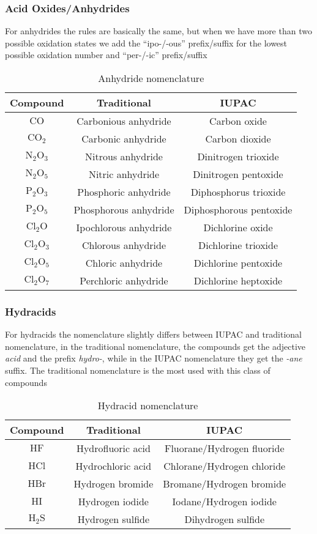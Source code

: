 \documentclass[../qm.tex]{subfiles}
\begin{document}
\subsubsection{Acid Oxides/Anhydrides}
For anhydrides the rules are basically the same, but when we have more than two possible oxidation states we add the ``ipo-/-ous'' prefix/suffix for the lowest possible oxidation number and ``per-/-ic'' prefix/suffix 
\begin{table}[H]
	\centering
	\begin{tabular}{c|c|c}
		Compound&Traditional&IUPAC\\\hline
		$\mathrm{CO}$&Carbonious anhydride&Carbon oxide\\\hline
		$\mathrm{CO_2}$&Carbonic anhydride&Carbon dioxide\\\hline
		$\mathrm{N_2O_3}$&Nitrous anhydride&Dinitrogen trioxide\\\hline
		$\mathrm{N_2O_5}$&Nitric anhydride&Dinitrogen pentoxide\\\hline
		$\mathrm{P_2O_3}$&Phosphoric anhydride&Diphosphorus trioxide\\\hline
		$\mathrm{P_2O_5}$&Phosphorous anhydride&Diphosphorous pentoxide\\\hline
		$\mathrm{Cl_2O}$&Ipochlorous anhydride&Dichlorine oxide\\\hline
		$\mathrm{Cl_2O_3}$&Chlorous anhydride&Dichlorine trioxide\\\hline
		$\mathrm{Cl_2O_5}$&Chloric anhydride&Dichlorine pentoxide\\\hline
		$\mathrm{Cl_2O_7}$&Perchloric anhydride&Dichlorine heptoxide\\\hline
	\end{tabular}
	\caption{Anhydride nomenclature}
	\label{tab:anhydrides.chem}
\end{table}
\subsubsection{Hydracids}
For hydracids the nomenclature slightly differs between IUPAC and traditional nomenclature, in the traditional nomenclature, the compounds get the adjective \textit{acid} and the prefix \textit{hydro-}, while in the IUPAC nomenclature they get the \textit{-ane} suffix. The traditional nomenclature is the most used with this class of compounds
\begin{table}[H]
	\centering
	\begin{tabular}{c|c|c}
		Compound&Traditional&IUPAC\\\hline	
		$\mathrm{HF}$&Hydrofluoric acid&Fluorane/Hydrogen fluoride\\\hline
		$\mathrm{HCl}$&Hydrochloric acid&Chlorane/Hydrogen chloride\\\hline	
		$\mathrm{HBr}$&Hydrogen bromide&Bromane/Hydrogen bromide\\\hline	
		$\mathrm{HI}$&Hydrogen iodide&Iodane/Hydrogen iodide\\\hline
		$\mathrm{H_2S}$&Hydrogen sulfide&Dihydrogen sulfide\\\hline	
	\end{tabular}
	\caption{Hydracid nomenclature}
	\label{tab:hudracid.chem}
\end{table}
\end{document}
